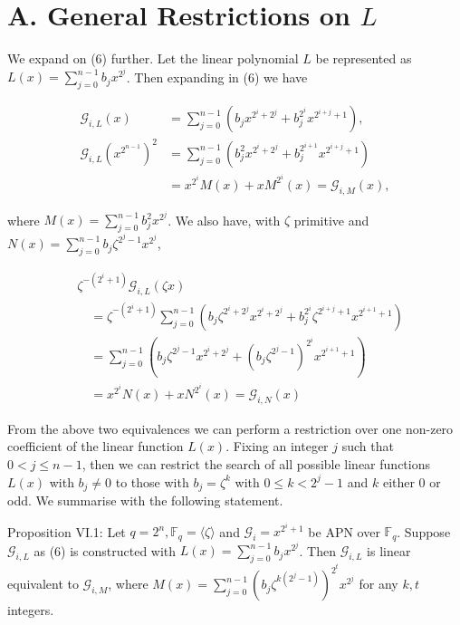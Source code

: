 \documentclass[10pt]{article}
\begin{document}
\section*{A. General Restrictions on $L$}
We expand on (6) further. Let the linear polynomial $L$ be represented as $L(x)=\sum_{j=0}^{n-1} b_{j} x^{2^{j}}$. Then expanding in (6) we have

$$
\begin{aligned}
\mathcal{G}_{i, L}(x) & =\sum_{j=0}^{n-1}\left(b_{j} x^{2^{i}+2^{j}}+b_{j}^{2^{i}} x^{2^{i+j}+1}\right), \\
\mathcal{G}_{i, L}\left(x^{2^{n-1}}\right)^{2} & =\sum_{j=0}^{n-1}\left(b_{j}^{2} x^{2^{i}+2^{j}}+b_{j}^{2^{i+1}} x^{2^{i+j}+1}\right) \\
& =x^{2^{i}} M(x)+x M^{2^{i}}(x)=\mathcal{G}_{i, M}(x),
\end{aligned}
$$

where $M(x)=\sum_{j=0}^{n-1} b_{j}^{2} x^{2^{j}}$. We also have, with $\zeta$ primitive and $N(x)=\sum_{j=0}^{n-1} b_{j} \zeta^{2^{j}-1} x^{2^{j}}$,

$$
\begin{aligned}
& \zeta^{-\left(2^{i}+1\right)} \mathcal{G}_{i, L}(\zeta x) \\
& \quad=\zeta^{-\left(2^{i}+1\right)} \sum_{j=0}^{n-1}\left(b_{j} \zeta^{2^{i}+2^{j}} x^{2^{i}+2^{j}}+b_{j}^{2^{i}} \zeta^{2^{i+j}+1} x^{2^{i+1}+1}\right) \\
& \quad=\sum_{j=0}^{n-1}\left(b_{j} \zeta^{2^{j}-1} x^{2^{i}+2^{j}}+\left(b_{j} \zeta^{2^{j}-1}\right)^{2^{i}} x^{2^{i+1}+1}\right) \\
& \quad=x^{2^{i}} N(x)+x N^{2^{i}}(x)=\mathcal{G}_{i, N}(x)
\end{aligned}
$$

From the above two equivalences we can perform a restriction over one non-zero coefficient of the linear function $L(x)$. Fixing an integer $j$ such that $0<j \leq n-1$, then we can restrict the search of all possible linear functions $L(x)$ with $b_{j} \neq 0$ to those with $b_{j}=\zeta^{k}$ with $0 \leq k<2^{j}-1$ and $k$ either 0 or odd. We summarise with the following statement.

Proposition VI.1: Let $q=2^{n}, \mathbb{F}_{q}=\langle\zeta\rangle$ and $\mathcal{G}_{i}=x^{2^{i}+1}$ be APN over $\mathbb{F}_{q}$. Suppose $\mathcal{G}_{i, L}$ as (6) is constructed with $L(x)= \sum_{j=0}^{n-1} b_{j} x^{2^{j}}$. Then $\mathcal{G}_{i, L}$ is linear equivalent to $\mathcal{G}_{i, M}$, where $M(x)=\sum_{j=0}^{n-1}\left(b_{j} \zeta^{k\left(2^{j}-1\right)}\right)^{2^{t}} x^{2^{j}}$ for any $k, t$ integers.
\end{document}
